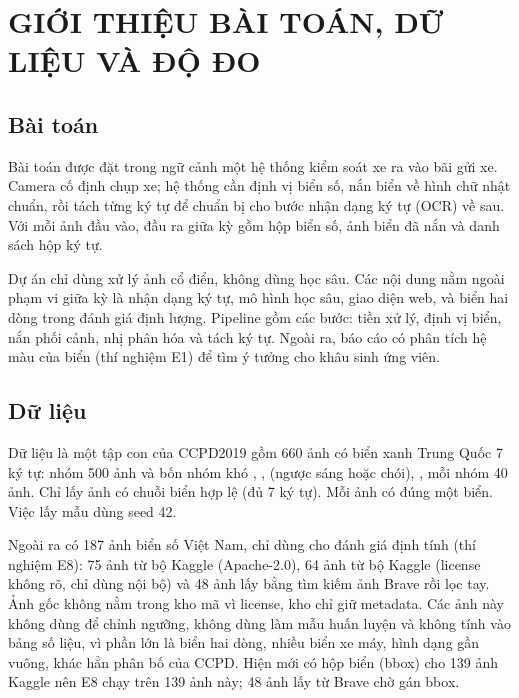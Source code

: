\chapter{GIỚI THIỆU BÀI TOÁN, DỮ LIỆU VÀ ĐỘ ĐO}
\label{chap:intro}

\section{Bài toán}
\label{sec:problem}

Bài toán được đặt trong ngữ cảnh một hệ thống kiểm soát xe ra vào bãi gửi xe. Camera cố định chụp xe; hệ thống cần định vị biển số, nắn biển về hình chữ nhật chuẩn, rồi tách từng ký tự để chuẩn bị cho bước nhận dạng ký tự (OCR) về sau. Với mỗi ảnh đầu vào, đầu ra giữa kỳ gồm hộp biển số, ảnh biển đã nắn và danh sách hộp ký tự.

Dự án chỉ dùng xử lý ảnh cổ điển, không dùng học sâu. Các nội dung nằm ngoài phạm vi giữa kỳ là nhận dạng ký tự, mô hình học sâu, giao diện web, và biển hai dòng trong đánh giá định lượng. Pipeline gồm các bước: tiền xử lý, định vị biển, nắn phối cảnh, nhị phân hóa và tách ký tự. Ngoài ra, báo cáo có phân tích hệ màu của biển (thí nghiệm E1) để tìm ý tưởng cho khâu sinh ứng viên.

\section{Dữ liệu}
\label{sec:data}

Dữ liệu là một tập con của CCPD2019 \cite{ccpd} gồm 660 ảnh có biển xanh Trung Quốc 7 ký tự: nhóm  500 ảnh và bốn nhóm khó , ,  (ngược sáng hoặc chói), , mỗi nhóm 40 ảnh. Chỉ lấy ảnh có chuỗi biển hợp lệ (đủ 7 ký tự). Mỗi ảnh có đúng một biển. Việc lấy mẫu dùng seed 42.

Ngoài ra có 187 ảnh biển số Việt Nam, chỉ dùng cho đánh giá định tính (thí nghiệm E8): 75 ảnh từ bộ Kaggle  (Apache-2.0), 64 ảnh từ bộ Kaggle  (license không rõ, chỉ dùng nội bộ) và 48 ảnh lấy bằng tìm kiếm ảnh Brave rồi lọc tay. Ảnh gốc không nằm trong kho mã vì license, kho chỉ giữ metadata. Các ảnh này không dùng để chỉnh ngưỡng, không dùng làm mẫu huấn luyện và không tính vào bảng số liệu, vì phần lớn là biển hai dòng, nhiều biển xe máy, hình dạng gần vuông, khác hẳn phân bố của CCPD. Hiện mới có hộp biển (bbox) cho 139 ảnh Kaggle nên E8 chạy trên 139 ảnh này; 48 ảnh lấy từ Brave chờ gán bbox.

